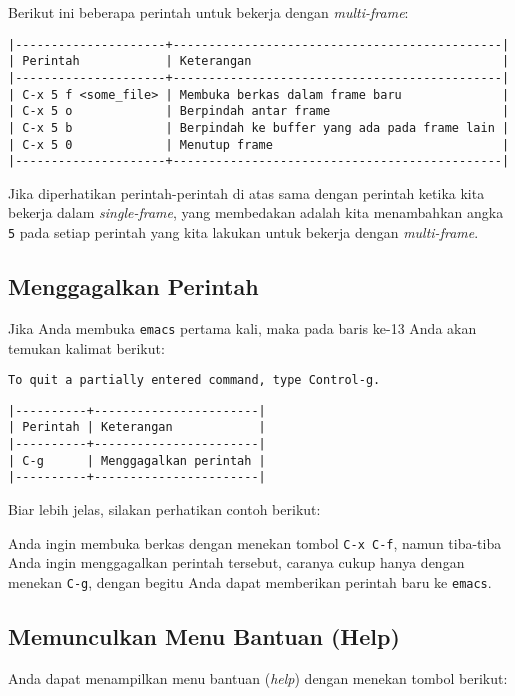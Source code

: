 \documentclass{article}
\begin{document}
Berikut ini beberapa perintah untuk bekerja dengan \emph{multi-frame}:

\begin{verbatim}
|---------------------+----------------------------------------------|
| Perintah            | Keterangan                                   |
|---------------------+----------------------------------------------|
| C-x 5 f <some_file> | Membuka berkas dalam frame baru              |
| C-x 5 o             | Berpindah antar frame                        |
| C-x 5 b             | Berpindah ke buffer yang ada pada frame lain |
| C-x 5 0             | Menutup frame                                |
|---------------------+----------------------------------------------|
\end{verbatim}

Jika diperhatikan perintah-perintah di atas sama dengan perintah ketika kita
bekerja dalam \emph{single-frame}, yang membedakan adalah kita menambahkan
angka \verb=5= pada setiap perintah yang kita lakukan untuk bekerja dengan 
\emph{multi-frame}.

\subsection{Menggagalkan Perintah}
Jika Anda membuka \verb=emacs= pertama kali, maka pada baris ke-13 Anda akan
temukan kalimat berikut:

\begin{verbatim}
To quit a partially entered command, type Control-g.
\end{verbatim}

\begin{verbatim}
|----------+-----------------------|
| Perintah | Keterangan            |
|----------+-----------------------|
| C-g      | Menggagalkan perintah |
|----------+-----------------------|
\end{verbatim}

Biar lebih jelas, silakan perhatikan contoh berikut:

Anda ingin membuka berkas dengan menekan tombol \verb=C-x C-f=, namun 
tiba-tiba Anda ingin menggagalkan perintah tersebut, caranya cukup hanya
dengan menekan \verb=C-g=, dengan begitu Anda dapat memberikan perintah
baru ke \verb=emacs=.

\subsection{Memunculkan Menu Bantuan (Help)}
Anda dapat menampilkan menu bantuan (\emph{help}) dengan menekan tombol
berikut:
\end{document}
